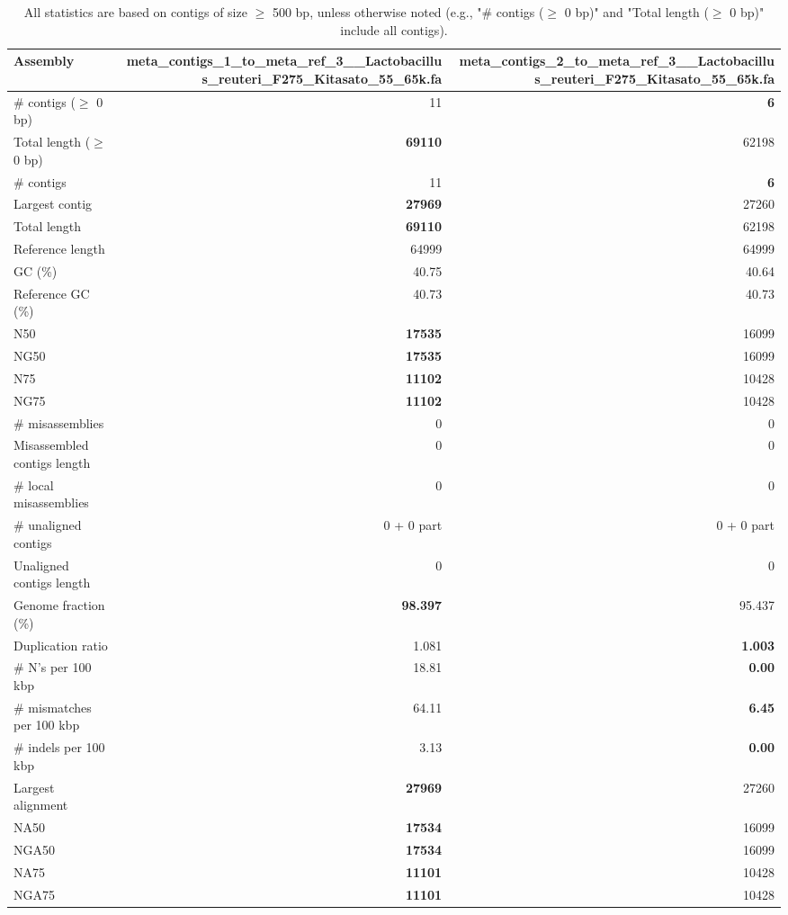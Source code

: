 \documentclass[12pt,a4paper]{article}
\begin{document}
\begin{table}[ht]
\begin{center}
\caption{All statistics are based on contigs of size $\geq$ 500 bp, unless otherwise noted (e.g., "\# contigs ($\geq$ 0 bp)" and "Total length ($\geq$ 0 bp)" include all contigs).}
\begin{tabular}{|l*{2}{|r}|}
\hline
Assembly & meta\_contigs\_1\_to\_meta\_ref\_3\_\_Lactobacillus\_reuteri\_F275\_Kitasato\_55\_65k.fa & meta\_contigs\_2\_to\_meta\_ref\_3\_\_Lactobacillus\_reuteri\_F275\_Kitasato\_55\_65k.fa \\ \hline
\# contigs ($\geq$ 0 bp) & 11 & {\bf 6} \\ \hline
Total length ($\geq$ 0 bp) & {\bf 69110} & 62198 \\ \hline
\# contigs & 11 & {\bf 6} \\ \hline
Largest contig & {\bf 27969} & 27260 \\ \hline
Total length & {\bf 69110} & 62198 \\ \hline
Reference length & 64999 & 64999 \\ \hline
GC (\%) & 40.75 & 40.64 \\ \hline
Reference GC (\%) & 40.73 & 40.73 \\ \hline
N50 & {\bf 17535} & 16099 \\ \hline
NG50 & {\bf 17535} & 16099 \\ \hline
N75 & {\bf 11102} & 10428 \\ \hline
NG75 & {\bf 11102} & 10428 \\ \hline
\# misassemblies & 0 & 0 \\ \hline
Misassembled contigs length & 0 & 0 \\ \hline
\# local misassemblies & 0 & 0 \\ \hline
\# unaligned contigs & 0 + 0 part & 0 + 0 part \\ \hline
Unaligned contigs length & 0 & 0 \\ \hline
Genome fraction (\%) & {\bf 98.397} & 95.437 \\ \hline
Duplication ratio & 1.081 & {\bf 1.003} \\ \hline
\# N's per 100 kbp & 18.81 & {\bf 0.00} \\ \hline
\# mismatches per 100 kbp & 64.11 & {\bf 6.45} \\ \hline
\# indels per 100 kbp & 3.13 & {\bf 0.00} \\ \hline
Largest alignment & {\bf 27969} & 27260 \\ \hline
NA50 & {\bf 17534} & 16099 \\ \hline
NGA50 & {\bf 17534} & 16099 \\ \hline
NA75 & {\bf 11101} & 10428 \\ \hline
NGA75 & {\bf 11101} & 10428 \\ \hline
\end{tabular}
\end{center}
\end{table}
\end{document}
